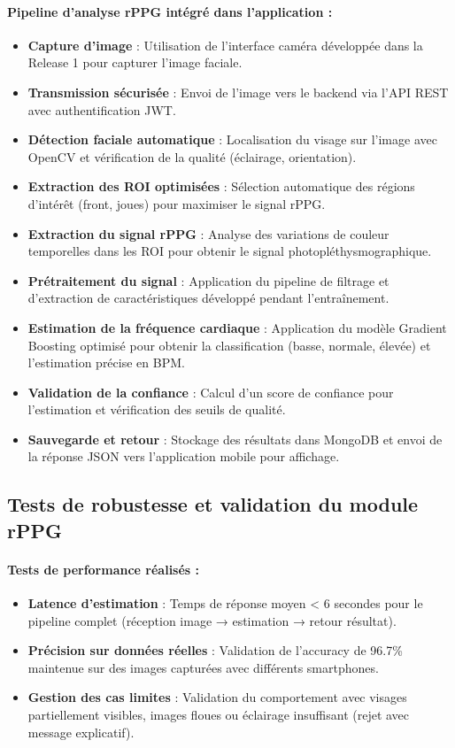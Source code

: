 \paragraph{Pipeline d'analyse rPPG intégré dans l'application :}
\begin{itemize}
    \item \textbf{Capture d'image} : Utilisation de l'interface caméra développée dans la Release 1 pour capturer l'image faciale.
    \item \textbf{Transmission sécurisée} : Envoi de l'image vers le backend via l'API REST avec authentification JWT.
    \item \textbf{Détection faciale automatique} : Localisation du visage sur l'image avec OpenCV et vérification de la qualité (éclairage, orientation).
    \item \textbf{Extraction des ROI optimisées} : Sélection automatique des régions d'intérêt (front, joues) pour maximiser le signal rPPG.
    \item \textbf{Extraction du signal rPPG} : Analyse des variations de couleur temporelles dans les ROI pour obtenir le signal photopléthysmographique.
    \item \textbf{Prétraitement du signal} : Application du pipeline de filtrage et d'extraction de caractéristiques développé pendant l'entraînement.
    \item \textbf{Estimation de la fréquence cardiaque} : Application du modèle Gradient Boosting optimisé pour obtenir la classification (basse, normale, élevée) et l'estimation précise en BPM.
    \item \textbf{Validation de la confiance} : Calcul d'un score de confiance pour l'estimation et vérification des seuils de qualité.
    \item \textbf{Sauvegarde et retour} : Stockage des résultats dans MongoDB et envoi de la réponse JSON vers l'application mobile pour affichage.
\end{itemize}

\subsection{Tests de robustesse et validation du module rPPG}

\paragraph{Tests de performance réalisés :}
\begin{itemize}
    \item \textbf{Latence d'estimation} : Temps de réponse moyen < 6 secondes pour le pipeline complet (réception image → estimation → retour résultat).
    \item \textbf{Précision sur données réelles} : Validation de l'accuracy de 96.7\% maintenue sur des images capturées avec différents smartphones.
   \item \textbf{Gestion des cas limites} : Validation du comportement avec visages partiellement visibles, images floues ou éclairage insuffisant (rejet avec message explicatif).
\end{itemize}

